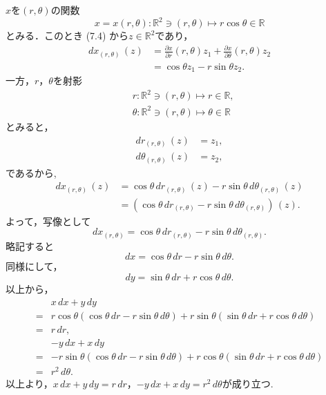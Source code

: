
\begin{tanswer}
  $x$を$(r,\theta)$の関数
  \[
    x = x(r,\theta) \colon \mathbb{R}^2 \ni (r,\theta) \mapsto r \cos \theta \in\mathbb{R}
  \]
  とみる．このとき (7.4) から$ z\in \mathbb{R}^2$であり，
  \begin{align*}
    dx_{(r,\theta)} \, (z) & = \frac{\partial x}{\partial r} (r,\theta) z_1 + \frac{\partial x}{\partial \theta} (r,\theta) z_2 \\
                           & = \cos \theta z_1 - r \sin \theta z_2.
  \end{align*}
  一方，$r$，$\theta$を射影
  \begin{align*}
     & r \colon \mathbb{R}^2 \ni (r,\theta) \mapsto r \in \mathbb{R} ,         \\
     & \theta \colon \mathbb{R}^2 \ni (r,\theta) \mapsto \theta \in \mathbb{R}
  \end{align*}
  とみると，
  \begin{align*}
    dr_{(r,\theta)} \, (z)      & = z_1, \\
    d\theta_{(r,\theta)} \, (z) & = z_2,
  \end{align*}
  であるから,
  \begin{align*}
    dx_{(r,\theta)} \, (z) & = \cos \theta \, d r_{(r,\theta)} \, (z) - r \sin \theta \, d \theta_{(r,\theta)} \, (z) \\
                           & = (\cos \theta \, d r_{(r,\theta)} - r \sin \theta \, d \theta_{(r,\theta)}) \, (z).
  \end{align*}
  よって，写像として
  \[
    dx_{(r,\theta)} = \cos \theta \,dr_{(r,\theta)} - r \sin \theta \,d \theta_{(r,\theta)}.
  \]
  略記すると
  \[
    dx = \cos \theta \,dr - r \sin \theta \,d \theta.
  \]
  同様にして，
  \[
    dy = \sin \theta \,dr + r \cos \theta \,d \theta.
  \]
  以上から，
  \begin{align*}
      & x \, dx +y \, dy                                                                                                          \\
    = & r \cos \theta(\cos \theta \, dr - r \sin \theta \, d \theta)+r \sin \theta(\sin \theta \, dr + r \cos \theta \, d \theta) \\
    = & r \, dr,                                                                                                                  \\
      & -y \, dx + x \, dy                                                                                                        \\
    = & -r \sin \theta (\cos \theta  \, dr -r\sin \theta \, d\theta)+r \cos \theta (\sin \theta \, dr + r \cos \theta \, d\theta) \\
    = & r^2 \, d \theta.
  \end{align*}
  以上より，$x \, dx +y \, dy = r \, dr$，$-y \, dx + x \, dy  = r^2 \, d \theta$が成り立つ.
\end{tanswer}

